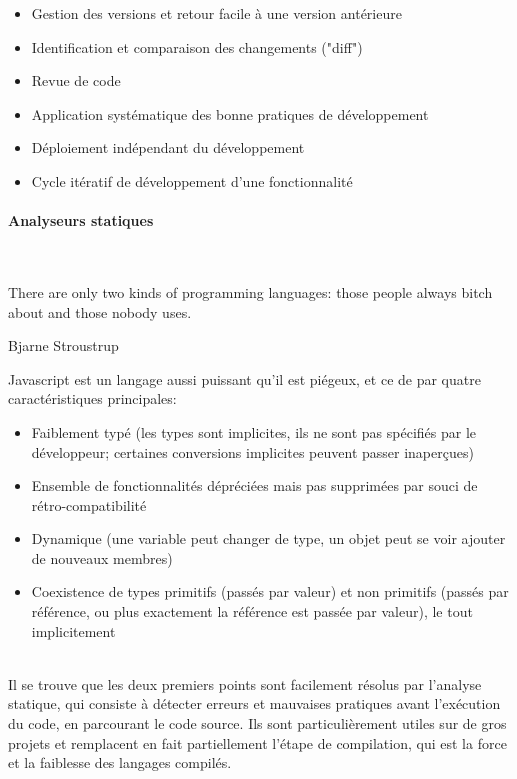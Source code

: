 \documentclass[a4paper,french,12pt]{article}
\begin{document}
 	\begin{itemize}
 		\item Gestion des versions et retour facile à une version antérieure
 		\item Identification et comparaison des changements ("diff")
 		\item Revue de code
 		\item Application systématique des bonne pratiques de développement
 		\item Déploiement indépendant du développement
 		\item Cycle itératif de développement d'une fonctionnalité
 	\end{itemize}
 	
	\paragraph{Analyseurs statiques}~\\	
	\epigraph{There are only two kinds of programming languages: those people always bitch about and those nobody uses.}{Bjarne Stroustrup}
	
		Javascript est un langage aussi puissant qu'il est piégeux, et ce de par quatre caractéristiques principales:~\\
		
		\begin{itemize}
			\item Faiblement typé (les types sont implicites, ils ne sont pas spécifiés par le développeur; certaines conversions implicites peuvent passer inaperçues)
			\item Ensemble de fonctionnalités dépréciées mais pas supprimées par souci de rétro-compatibilité
			\item Dynamique (une variable peut changer de type, un objet peut se voir ajouter de nouveaux membres)
			\item Coexistence de types primitifs (passés par valeur) et non primitifs (passés par référence, ou plus exactement la référence est passée par valeur), le tout implicitement
		\end{itemize}	~\\	
		
		Il se trouve que les deux premiers points sont facilement résolus par l'analyse statique, qui consiste à détecter erreurs et mauvaises pratiques avant l'exécution du code, en parcourant le code source.
		Ils sont particulièrement utiles sur de gros projets et remplacent en fait partiellement l'étape de compilation, qui est la force et la faiblesse des langages compilés.~\\	
		
\end{document}

